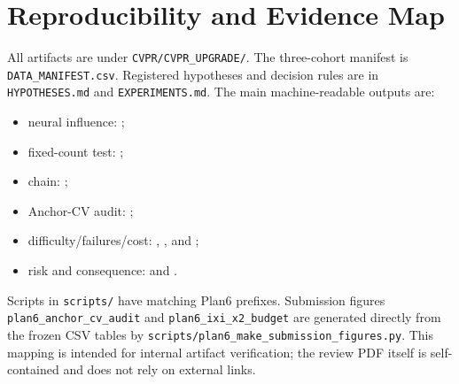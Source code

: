 \documentclass[10pt,twocolumn,letterpaper]{article}
\begin{document}
\section{Reproducibility and Evidence Map}
All artifacts are under \texttt{CVPR/CVPR\_UPGRADE/}. The three-cohort manifest is \texttt{DATA\_MANIFEST.csv}. Registered hypotheses and decision rules are in \texttt{HYPOTHESES.md} and \texttt{EXPERIMENTS.md}. The main machine-readable outputs are:
\begin{itemize}
\item neural influence: ;
\item fixed-count test: ;
\item chain: ;
\item Anchor-CV audit: ;
\item difficulty/failures/cost: , , and ;
\item risk and consequence:  and .
\end{itemize}
Scripts in \texttt{scripts/} have matching Plan6 prefixes. Submission figures \texttt{plan6\_anchor\_cv\_audit} and \texttt{plan6\_ixi\_x2\_budget} are generated directly from the frozen CSV tables by \texttt{scripts/plan6\_make\_submission\_figures.py}. This mapping is intended for internal artifact verification; the review PDF itself is self-contained and does not rely on external links.
\end{document}
